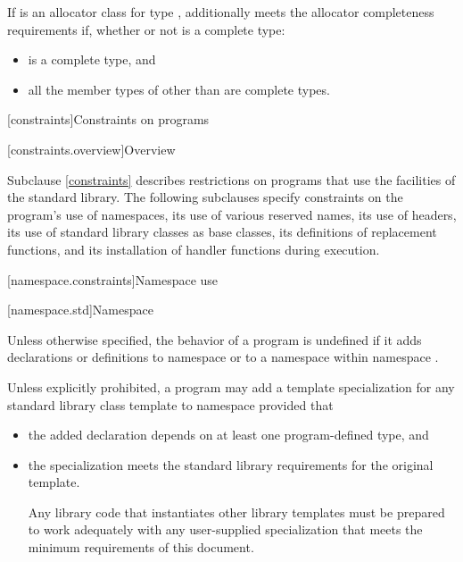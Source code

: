 \pnum
If  is an allocator class for type ,
 additionally meets the allocator completeness requirements if,
whether or not  is a complete type:
\begin{itemize}
\item {} is a complete type, and
\item all the member types of 
  other than  are complete types.
\end{itemize}

[constraints]{Constraints on programs}

[constraints.overview]{Overview}

\pnum
Subclause \ref{constraints} describes restrictions on \Cpp{} programs that use the facilities of
the \Cpp{} standard library. The following subclauses specify constraints on the
program's use of namespaces, its use of various reserved
names, its use of headers, its use of
standard library classes as base classes, its
definitions of replacement functions, and its
installation of handler functions during execution.

[namespace.constraints]{Namespace use}

[namespace.std]{Namespace }

\pnum
Unless otherwise specified,
the behavior of a \Cpp{} program is undefined if it adds declarations or definitions to namespace
or to a namespace within namespace
.

\pnum
Unless explicitly prohibited,
a program may add a template specialization for
any standard library class template
to namespace
 provided that
\begin{itemize}
\item the added declaration
depends on at least one program-defined type, and

\item the specialization meets the standard library requirements
for the original template.
\begin{footnote}
Any
library code that instantiates other library templates
must be prepared to work adequately with any user-supplied specialization
that meets the minimum requirements of this document.
\end{footnote}
\end{itemize}

